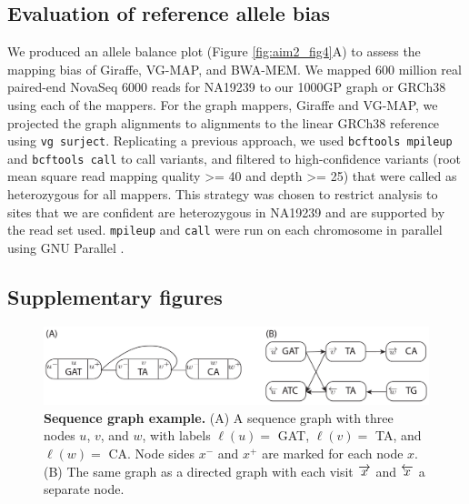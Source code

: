 \documentclass[11pt]{ucscthesis}
\newcommand{\nodelabel}[1]{\ensuremath{\ell\left( #1 \right)}}
\newcommand{\leftside}[1]{\ensuremath{{ #1 }^{-}}}
\newcommand{\rightside}[1]{\ensuremath{{ #1 }^{+}}}
\newcommand{\forwardnode}[1]{\ensuremath{\protect\overrightarrow{ #1 }}}
\newcommand{\reversenode}[1]{\ensuremath{\protect\overleftarrow{ #1 }}}
\begin{document}
\subsection{Evaluation of reference allele bias}
\label{subsec:aim2:srgiraffe_allelebias}
We produced an allele balance plot (Figure \ref{fig:aim2_fig4}A) to assess the mapping bias of Giraffe, VG-MAP, and BWA-MEM.
We mapped 600 million real paired-end NovaSeq 6000 reads for NA19239 to our 1000GP graph or GRCh38 using each of the mappers.
For the graph mappers, Giraffe and VG-MAP, we projected the graph alignments to alignments to the linear GRCh38 reference using \texttt{vg surject}.
Replicating a previous approach\cite{crysnanto_bovine_2020}, we used \texttt{bcftools mpileup} and \texttt{bcftools call}\cite{li_samtools_2011} to call variants, and filtered to high-confidence variants (root mean square read mapping quality >= 40 and depth >= 25) that were called as heterozygous for all mappers.
This strategy was chosen to restrict analysis to sites that we are confident are heterozygous in NA19239 and are supported by the read set used.
\texttt{mpileup} and \texttt{call} were run on each chromosome in parallel using GNU Parallel \cite{Tange2011a}.




\newpage

\subsection{Supplementary figures}

\begin{figure}[H]
    \centering
    \includegraphics[width=\linewidth]{aim2_supplement_graph_example.pdf}
    \caption[Sequence graph example]{\textbf{Sequence graph example.}
      (A) A sequence graph with three nodes $u$, $v$, and $w$, with labels $\nodelabel{u} =$ GAT, $\nodelabel{v} =$ TA, and $\nodelabel{w} =$ CA. Node sides $\leftside{x}$ and $\rightside{x}$ are marked for each node $x$.
      (B) The same graph as a directed graph with each visit $\forwardnode{x}$ and $\reversenode{x}$ a separate node.
    }
    \label{fig:aim2_supplement_graph-example}
    \label{fig:first}
\end{figure}
\end{document}
